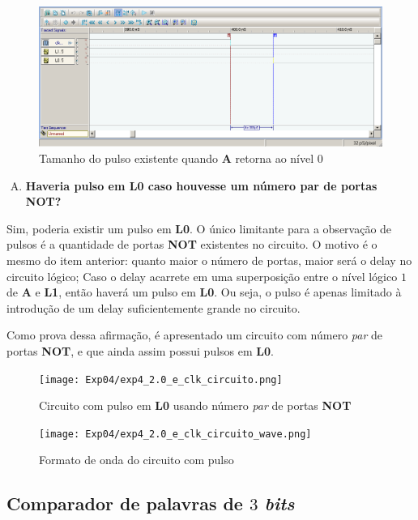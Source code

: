 \documentclass[12pt]{article}
\begin{document}
\begin{figure}[H]
    \centering
    \includegraphics[width=.9\textwidth]{Exp04/exp4_2.0_d_clk_wave_lenght_ao_voltar_para_zero.png}
    \caption{Tamanho do pulso existente quando \textbf{A} retorna ao nível 0}\label{fig:exp4_2.0_d_clk_wave_lenght_ao_voltar_para_zero.png}
\end{figure}

\begin{enumerate}[E)]
\item \textbf{Haveria pulso em L0 caso houvesse um número par de portas NOT?}
\end{enumerate}

Sim, poderia existir um pulso em \textbf{L0}. O único limitante para a
observação de pulsos é a quantidade de portas \textbf{NOT} existentes no
circuito. O motivo é o mesmo do item anterior: quanto maior o número de portas,
maior será o delay no circuito lógico; Caso o delay acarrete em uma superposição
entre o nível lógico $1$ de \textbf{A} e \textbf{L1}, então haverá um pulso em
\textbf{L0}. Ou seja, o pulso é apenas limitado à introdução de um delay
suficientemente grande no circuito.

Como prova dessa afirmação, é apresentado um circuito com número \emph{par} de
portas \textbf{NOT}, e que ainda assim possui pulsos em \textbf{L0}.

\begin{figure}[H]
    \centering
    \texttt{[image: Exp04/exp4\_2.0\_e\_clk\_circuito.png]}
    \caption{Circuito com pulso em \textbf{L0} usando número \emph{par} de portas \textbf{NOT}}\label{fig:exp4_2.0_e_clk_circuito.png}
\end{figure}

\begin{figure}[H]
    \centering
    \texttt{[image: Exp04/exp4\_2.0\_e\_clk\_circuito\_wave.png]}
    \caption{Formato de onda do circuito com pulso}\label{fig:exp4_2.0_e_clk_circuito_wave.png}
\end{figure}


\subsection{Comparador de palavras de \(3\) \emph{bits}}\label{sec:comparador_de_palavras_3_bits}
\end{document}
